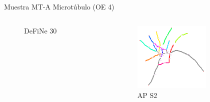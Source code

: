 \begin{frame}{Muestra MT-A Microt\'ubulo (OE 4)}
\begin{columns}
\begin{column}{0.22\textwidth}
\begin{figure}
                \caption{DeFiNe 30\textdegree}
            \end{figure}
        \end{column}
        \begin{column}{0.22\textwidth}
            \begin{figure}
                \centering
                \includegraphics[height=1.3in]{Pictures/50-ROIs-Spinning-Marchantia-phil-s10-v05-nobg-antLabeled.png}
                \caption{AP S2}
            \end{figure}
        \end{column}
    \end{columns}

    \begin{table}[h]
    \caption{Grafo de 29 aristas}
    \end{table}
\end{frame}


